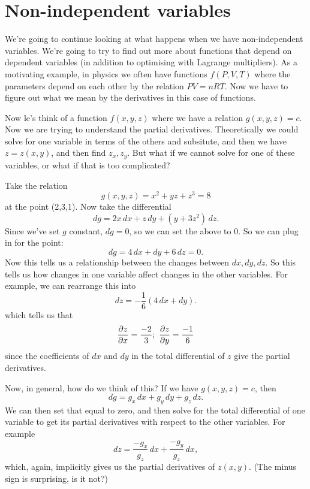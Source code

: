 \section{Non-independent variables}

We're going to continue looking at what happens when we have non-independent variables. We're going to try to find out more about functions that depend on dependent variables (in addition to optimising with Lagrange multipliers). As a motivating example, in physics we often have functions $f(P,V,T)$ where the parameters depend on each other by the relation $PV = nRT$. Now we have to figure out what we mean by the derivatives in this case of functions. 

Now le's think of a function $f(x,y,z)$ where we have a relation $g(x,y,z)=c$. Now we are trying to understand the partial derivatives. Theoretically we could solve for one variable in terms of the others and subsitute, and then we have $z=z(x,y)$, and then find $z_x,z_y$. But what if we cannot solve for one of these variables, or what if that is too complicated?

\bex 
Take the relation
\[ g(x,y,z)= x^2 +yz +z^3 = 8 \]
at the point (2,3,1). Now take the differential
\[ dg = 2x\,dx + z\,dy +(y+3z^2)\,dz. \]
Since we've set $g$ constant, $dg=0$, so we can set the above to 0. 
So we can plug in for the point:
\[ dg = 4\,dx + dy+6\,dz=0. \]
Now this tells us a relationship between the changes between $dx,dy,dz$. So this tells us how changes in one variable affect changes in the other variables. For example, we can rearrange this into 
\[ dz = -\frac 16 (4\,dx + dy). \]
which tells us that 
\[ \frac{\partial z}{\partial x} = \frac {-2}3;\ \frac{\partial z}{\partial y}=\frac{-1}6 \]
since the coefficients of $dx$ and $dy$ in the total differential of $z$ give the partial derivatives. 
\eex 

Now, in general, how do we think of this? If we have $g(x,y,z)=c$, then 
\[ dg = g_x\,dx +g_y\,dy+g_z\,dz. \]
We can then set that equal to zero, and then solve for the total differential of one variable to get its partial derivatives with respect to the other variables. For example
\[ dz = \frac{-g_x}{g_z}\,dx + \frac{-g_y}{g_z}\,dx, \]
which, again, implicitly gives us the partial derivatives of $z(x,y)$. (The minus sign is surprising, is it not?)

